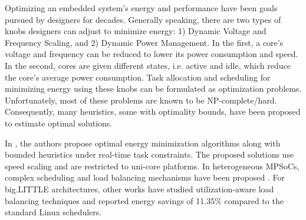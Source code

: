 Optimizing an embedded system's energy and performance have been goals pursued by designers for decades. Generally speaking, there are two types of knobs designers can adjust to minimize energy: 1) Dynamic Voltage and Frequency Scaling, and 2) Dynamic Power Management. In the first, a core's voltage and frequency can be reduced to lower its power consumption and speed. In the second, cores are given different states, i.e. active and idle, which reduce the core's average power consumption. Task allocation and scheduling for minimizing energy using these knobs can be formulated as optimization problems. Unfortunately, most of these problems are known to be NP-complete/hard. Consequently, many heuristics, some with optimality bounds, have been proposed to estimate optimal solutions.

In \cite{YDS, Aydin2001, Chen2007}, the authors propose optimal energy minimization algorithms along with bounded heuristics under real-time task constraints. The proposed solutions use speed scaling and are restricted to uni-core platforms. In heterogeneous MPSoCs, complex scheduling and load balancing mechanisms have been proposed \cite{Sarma2015}. For big.LITTLE architectures, other works \cite{Kim2014} have studied utilization-aware load balancing techniques and reported energy savings of 11.35\% compared to the standard Linux schedulers. 


